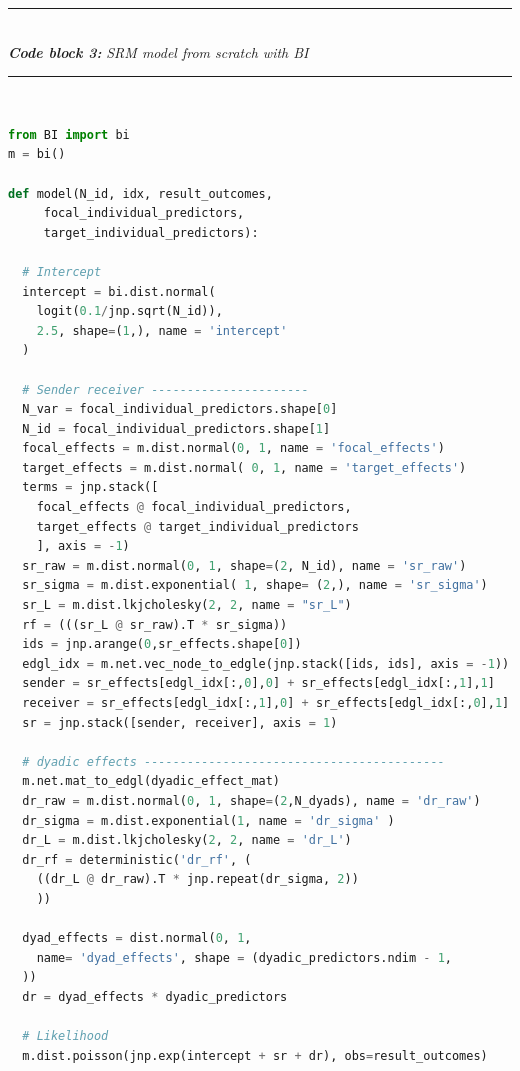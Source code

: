 \documentclass[blind,lineno,num-refs]{wiley-article}
\begin{document}
\label{code:block3_example} 
\noindent\rule{\linewidth}{0.4pt}\\[0pt] %
\noindent\textbf{\textit{Code block 3: }} \textit{SRM model from scratch with BI}\\[-10pt]
\noindent\rule{\linewidth}{0.4pt}\\[-8pt] %
\vspace{-\parskip}\vspace{0pt}

\begin{lstlisting}[language=Python, label=lst:srm_scratch]
from BI import bi
m = bi()

def model(N_id, idx, result_outcomes,
     focal_individual_predictors, 
     target_individual_predictors):

  # Intercept 
  intercept = bi.dist.normal(
    logit(0.1/jnp.sqrt(N_id)), 
    2.5, shape=(1,), name = 'intercept'
  )

  # Sender receiver ----------------------
  N_var = focal_individual_predictors.shape[0]
  N_id = focal_individual_predictors.shape[1]  
  focal_effects = m.dist.normal(0, 1, name = 'focal_effects')
  target_effects = m.dist.normal( 0, 1, name = 'target_effects')
  terms = jnp.stack([
    focal_effects @ focal_individual_predictors,
    target_effects @ target_individual_predictors
    ], axis = -1)
  sr_raw = m.dist.normal(0, 1, shape=(2, N_id), name = 'sr_raw')
  sr_sigma = m.dist.exponential( 1, shape= (2,), name = 'sr_sigma')
  sr_L = m.dist.lkjcholesky(2, 2, name = "sr_L")
  rf = (((sr_L @ sr_raw).T * sr_sigma))
  ids = jnp.arange(0,sr_effects.shape[0])
  edgl_idx = m.net.vec_node_to_edgle(jnp.stack([ids, ids], axis = -1))
  sender = sr_effects[edgl_idx[:,0],0] + sr_effects[edgl_idx[:,1],1]
  receiver = sr_effects[edgl_idx[:,1],0] + sr_effects[edgl_idx[:,0],1]
  sr = jnp.stack([sender, receiver], axis = 1)

  # dyadic effects ------------------------------------------
  m.net.mat_to_edgl(dyadic_effect_mat)
  dr_raw = m.dist.normal(0, 1, shape=(2,N_dyads), name = 'dr_raw')
  dr_sigma = m.dist.exponential(1, name = 'dr_sigma' )
  dr_L = m.dist.lkjcholesky(2, 2, name = 'dr_L')
  dr_rf = deterministic('dr_rf', (
    ((dr_L @ dr_raw).T * jnp.repeat(dr_sigma, 2))
    ))

  dyad_effects = dist.normal(0, 1, 
    name= 'dyad_effects', shape = (dyadic_predictors.ndim - 1,
  ))
  dr = dyad_effects * dyadic_predictors

  # Likelihood                            
  m.dist.poisson(jnp.exp(intercept + sr + dr), obs=result_outcomes) 
\end{lstlisting}
\end{document}
